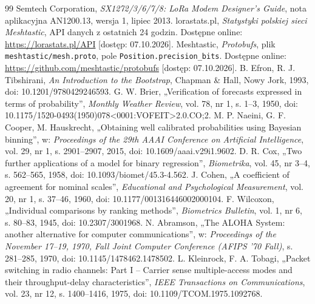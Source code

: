 \documentclass[12pt,a4paper,twoside]{report}
\theoremstyle{definition} %
\begin{document}
\begin{thebibliography}{99}
     Semtech Corporation, \emph{SX1272/3/6/7/8: LoRa Modem Designer's Guide}, nota aplikacyjna AN1200.13, wersja 1, lipiec 2013.
     lorastats.pl, \emph{Statystyki polskiej sieci Meshtastic}, API danych z ostatnich 24 godzin. Dostępne online: \url{https://lorastats.pl/API} [dostęp: 07.10.2026].
     Meshtastic, \emph{Protobufs}, plik \texttt{meshtastic/mesh.proto}, pole \texttt{Position.precision\_bits}. Dostępne online: \url{https://github.com/meshtastic/protobufs} [dostęp: 07.10.2026].
     B. Efron, R. J. Tibshirani, \emph{An Introduction to the Bootstrap}, Chapman \& Hall, Nowy Jork, 1993, doi: 10.1201/9780429246593.
     G. W. Brier, „Verification of forecasts expressed in terms of probability”, \emph{Monthly Weather Review}, vol. 78, nr 1, s. 1--3, 1950, doi: 10.1175/1520-0493(1950)078<0001:VOFEIT>2.0.CO;2.
     M. P. Naeini, G. F. Cooper, M. Hauskrecht, „Obtaining well calibrated probabilities using Bayesian binning”, w: \emph{Proceedings of the 29th AAAI Conference on Artificial Intelligence}, vol. 29, nr 1, s. 2901--2907, 2015, doi: 10.1609/aaai.v29i1.9602.
     D. R. Cox, „Two further applications of a model for binary regression”, \emph{Biometrika}, vol. 45, nr 3--4, s. 562--565, 1958, doi: 10.1093/biomet/45.3-4.562.
     J. Cohen, „A coefficient of agreement for nominal scales”, \emph{Educational and Psychological Measurement}, vol. 20, nr 1, s. 37--46, 1960, doi: 10.1177/001316446002000104.
     F. Wilcoxon, „Individual comparisons by ranking methods”, \emph{Biometrics Bulletin}, vol. 1, nr 6, s. 80--83, 1945, doi: 10.2307/3001968.
     N. Abramson, „The ALOHA System: another alternative for computer communications”, w: \emph{Proceedings of the November 17--19, 1970, Fall Joint Computer Conference (AFIPS '70 Fall)}, s. 281--285, 1970, doi: 10.1145/1478462.1478502.
     L. Kleinrock, F. A. Tobagi, „Packet switching in radio channels: Part I -- Carrier sense multiple-access modes and their throughput-delay characteristics”, \emph{IEEE Transactions on Communications}, vol. 23, nr 12, s. 1400--1416, 1975, doi: 10.1109/TCOM.1975.1092768.
	\end{thebibliography}
    \cleardoublepage

\end{document}
